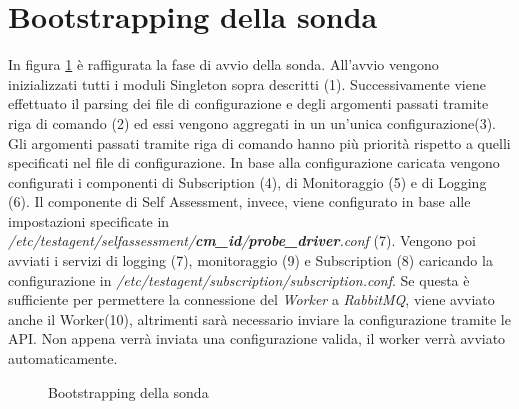 \documentclass[../main.tex]{subfiles}
\begin{document}
\section{Bootstrapping della sonda}
In figura \ref{fig:TestAgent} è raffigurata la fase di avvio della sonda.
All'avvio vengono inizializzati tutti i moduli Singleton sopra descritti (1).
Successivamente viene effettuato il parsing dei file di configurazione e degli argomenti passati tramite riga di comando (2) ed essi vengono aggregati in un un'unica configurazione(3). Gli argomenti passati tramite riga di comando hanno più priorità rispetto a quelli specificati nel file di configurazione.
In base alla configurazione caricata vengono configurati i componenti di Subscription (4), di Monitoraggio (5) e di Logging (6).
Il componente di Self Assessment, invece, viene configurato in base alle impostazioni specificate in \textit{/etc/testagent/selfassessment/\textbf{cm\_id}/\textbf{\textit{probe\_driver}}.conf} (7).
Vengono poi avviati i servizi di logging (7), monitoraggio (9) e Subscription (8) caricando la configurazione in \textit{/etc/testagent/subscription/subscription.conf}. Se questa è sufficiente per permettere la connessione del \textit{Worker} a \textit{RabbitMQ}, viene avviato anche il Worker(10), altrimenti sarà necessario inviare la configurazione tramite le API. Non appena verrà inviata una configurazione valida, il worker verrà avviato automaticamente.
\begin{figure}[H]
\centering
{}
\caption{Bootstrapping della sonda}\label{fig:TestAgent}
\end{figure}
\end{document}
